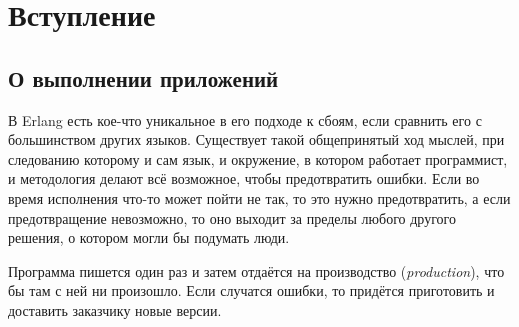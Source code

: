 \documentclass[11pt, oneside]{book}   	%
\begin{document}
\clearpage
\setcounter{page}{1}

\tableofcontents

\listoffigures

\hypersetup{linkcolor=violet}

\chapter*{Вступление}
\label{chap:introduction}
\setcounter{page}{1}


\section*{О выполнении приложений}
\label{sec:on-running-software}

В Erlang есть кое-что уникальное в его подходе к сбоям, если сравнить его с большинством других языков. Существует такой общепринятый ход мыслей, при следованию которому и сам язык, и окружение, в котором работает программист, и методология делают всё возможное, чтобы предотвратить ошибки. Если во время исполнения что-то может пойти не так, то это нужно предотвратить, а если предотвращение невозможно, то оно выходит за пределы любого другого решения, о котором могли бы подумать люди.

Программа пишется один раз и затем отдаётся на производство (\emph{production}), что бы там с ней ни произошло. Если случатся ошибки, то придётся приготовить и доставить заказчику новые версии.
\end{document}
